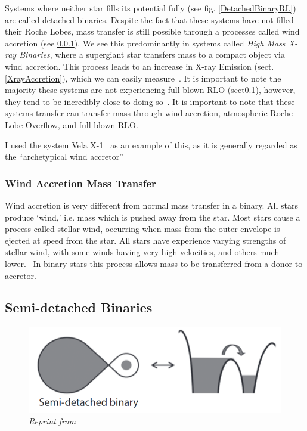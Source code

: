 \documentclass[12pt, a4paper]{article}
\begin{document}
        Systems where neither star fills its potential fully (see fig. \ref{DetachedBinaryRL}) are called detached binaries. Despite the fact that these systems have not filled their Roche Lobes, mass transfer is still possible through a processes called wind accretion (see \ref{WindAccretion}). We see this predominantly in systems called \textit{High Mass X-ray Binaries}, where a supergiant star transfers mass to a compact object via wind accretion. This process leads to an increase in X-ray Emission (sect. \ref{XrayAccretion}), which we can easily measure~\parencite{TaurisvandenHeuvel+2023}. It is important to note the majority these systems are not experiencing full-blown RLO (sect\ref{RLO}), however, they tend to be incredibly close to doing so~\parencite{TaurisvandenHeuvel+2023}. It is important to note that these systems transfer can transfer mass through wind accretion, atmospheric Roche Lobe Overflow, and full-blown RLO. 

        I used the system Vela X-1~\parencite{Kretschmar_2021} as an example of this, as it is generally regarded as the ``archetypical wind accretor''~\parencite{Kretschmar_2021} 

        \subsubsection{Wind Accretion Mass Transfer} \label{WindAccretion}
        Wind accretion is very different from normal mass transfer in a binary. All stars produce `wind,' i.e. mass which is pushed away from the star. Most stars cause a process called stellar wind, occurring when mass from the outer envelope is ejected at speed from the star. All stars have experience varying strengths of stellar wind, with some winds having very high velocities, and others much lower.~\parencite{Lamers_1999} In binary stars this process allows mass to be transferred from a donor to accretor.
        
        \subsection{\centering Semi-detached Binaries}\label{RLO} %

        \begin{figure}[H] 
            \centering
            \includegraphics[scale = .4]{figs/reused-figs/Tauris_Semi-detachedBinary.png}
            \caption{\textit{Reprint from~\parencite{TaurisvandenHeuvel+2023}}}
            \label{SemidetachedRL}
        \end{figure}
\end{document}
